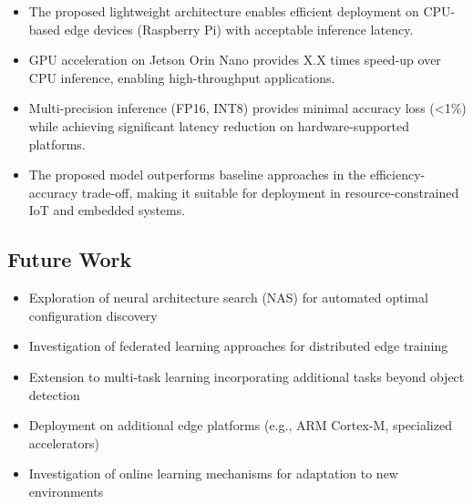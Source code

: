 \documentclass[11pt,a4paper]{article}
\begin{document}
\begin{itemize}
    \item The proposed lightweight architecture enables efficient deployment on CPU-based edge devices 
    (Raspberry Pi) with acceptable inference latency.
    
    \item GPU acceleration on Jetson Orin Nano provides X.X times speed-up over CPU inference, 
    enabling high-throughput applications.
    
    \item Multi-precision inference (FP16, INT8) provides minimal accuracy loss (<1\%) while achieving 
    significant latency reduction on hardware-supported platforms.
    
    \item The proposed model outperforms baseline approaches in the efficiency-accuracy trade-off, 
    making it suitable for deployment in resource-constrained IoT and embedded systems.
\end{itemize}

\subsection{Future Work}

\begin{itemize}
    \item Exploration of neural architecture search (NAS) for automated optimal configuration discovery
    \item Investigation of federated learning approaches for distributed edge training
    \item Extension to multi-task learning incorporating additional tasks beyond object detection
    \item Deployment on additional edge platforms (e.g., ARM Cortex-M, specialized accelerators)
    \item Investigation of online learning mechanisms for adaptation to new environments
\end{itemize}

\newpage

\end{document}
